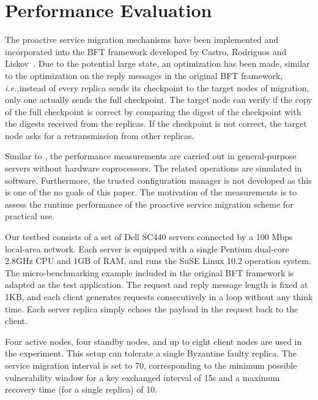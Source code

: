 \documentclass[times, 10pt, twocolumn]{article}
\newcommand{\ie}{{\it i.e.,}}
\begin{document}
\section{Performance Evaluation}
\label{perfsec}
The proactive service migration mechanisms 
have been implemented and incorporated into the BFT framework developed by 
Castro, Rodriguos and Liskov~\cite{bft-osdi99, bft-osdi2000, bft-acm, base}. 
Due to the potential large state, an optimization has been made, similar to 
the optimization on the reply messages in the original BFT framework, 
\ie instead of
every replica sends its checkpoint to the target nodes of migration,
only one actually sends the full checkpoint. The target node can verify if the
copy of the full checkpoint is correct by comparing the digest of the 
checkpoint with the digests received from the replicas. If the checkpoint is 
not correct, the target node asks for a retransmission from other replicas.

Similar to \cite{bft-acm}, the performance measurements are carried out
in general-purpose servers without hardware coprocessors.
The related operations are simulated in software. Furthermore,
the trusted configuration manager is not developed as this is
one of the no goals of this paper. The motivation of the measurements
is to assess the runtime performance of the proactive service migration
scheme for practical use.
 
Our testbed consists of a set of Dell SC440 servers connected by a 
100 Mbps local-area network. Each server is equipped with a single
Pentium dual-core 2.8GHz CPU and 1GB of RAM, and runs the SuSE Linux
10.2 operation system. The micro-benchmarking example included in
the original BFT framework is adapted as the test application.
The request and reply message length is fixed
at 1KB, and each client generates requests consecutively in a loop
without any think time. Each server replica
simply echoes the payload in the request back to the client.

Four active nodes, four standby nodes, and up to eight client nodes 
are used in the experiment. This setup can tolerate a single
Byzantine faulty replica. The service migration interval is set to 70,
corresponding to the minimum possible vulnerability window for a key
exchanged interval of 15s and a maximum recovery time (for a single replica)
of 10.
\end{document}
